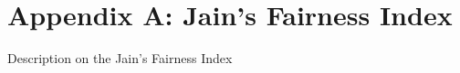 
\chapter{Appendix A: Jain's Fairness Index} %

\label{AppendixA} %


Description on the Jain's Fairness Index